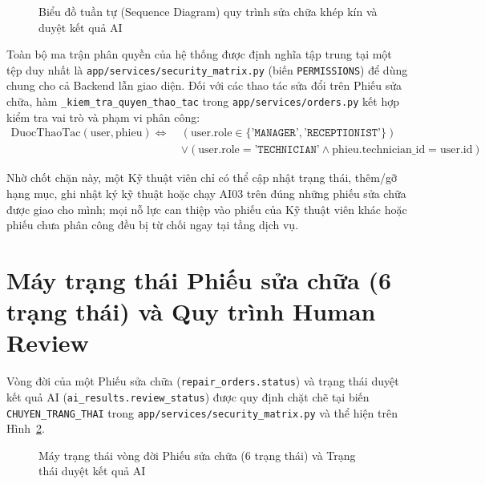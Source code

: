 \begin{figure}[H]
\centering
\vspace{2pt}

\vspace{2pt}
\caption{Biểu đồ tuần tự (Sequence Diagram) quy trình sửa chữa khép kín và duyệt kết quả AI}
\label{fig:g-repair-seq}
\end{figure}

Toàn bộ ma trận phân quyền của hệ thống được định nghĩa tập trung tại một tệp duy nhất là \texttt{app/services/security\_matrix.py} (biến \texttt{PERMISSIONS}) để dùng chung cho cả Backend lẫn giao diện. Đối với các thao tác sửa đổi trên Phiếu sửa chữa, hàm \texttt{\_kiem\_tra\_quyen\_thao\_tac} trong \texttt{app/services/orders.py} kết hợp kiểm tra vai trò và phạm vi phân công:
{\small
\begin{equation}
\begin{aligned}
\text{DuocThaoTac}(\text{user}, \text{phieu}) \iff\ & (\text{user.role} \in \{\texttt{'MANAGER'}, \texttt{'RECEPTIONIST'}\}) \\
&\lor \left(\text{user.role} = \texttt{'TECHNICIAN'} \land \text{phieu.technician\_id} = \text{user.id}\right)
\end{aligned}
\end{equation}
}

Nhờ chốt chặn này, một Kỹ thuật viên chỉ có thể cập nhật trạng thái, thêm/gỡ hạng mục, ghi nhật ký kỹ thuật hoặc chạy AI03 trên đúng những phiếu sửa chữa được giao cho mình; mọi nỗ lực can thiệp vào phiếu của Kỹ thuật viên khác hoặc phiếu chưa phân công đều bị từ chối ngay tại tầng dịch vụ.

\section{Máy trạng thái Phiếu sửa chữa (6 trạng thái) và Quy trình Human Review}

Vòng đời của một Phiếu sửa chữa (\texttt{repair\_orders.status}) và trạng thái duyệt kết quả AI (\texttt{ai\_results.review\_status}) được quy định chặt chẽ tại biến \texttt{CHUYEN\_TRANG\_THAI} trong \texttt{app/services/security\_matrix.py} và thể hiện trên Hình~\ref{fig:g-ro-state}.

\begin{figure}[H]
\centering
\vspace{2pt}

\vspace{2pt}
\caption{Máy trạng thái vòng đời Phiếu sửa chữa (6 trạng thái) và Trạng thái duyệt kết quả AI}
\label{fig:g-ro-state}
\end{figure}

